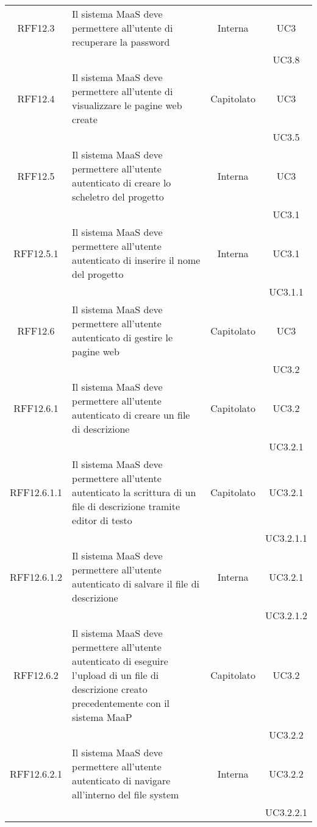 \begin{longtable}{|c|p{6cm}|c|c|}
\midrule
RFF12.3
& Il sistema MaaS deve permettere all'utente di recuperare la password
& Interna
& UC3\\
& & & UC3.8\\

\midrule
RFF12.4
& Il sistema MaaS deve permettere all'utente di visualizzare le pagine web create
& Capitolato
& UC3\\
& & & UC3.5\\

\midrule
RFF12.5
& Il sistema MaaS deve permettere all'utente autenticato di creare lo scheletro del progetto
& Interna
& UC3\\
& & & UC3.1\\

\midrule
RFF12.5.1
& Il sistema MaaS deve permettere all'utente autenticato di inserire il nome del progetto
& Interna
& UC3.1\\
& & & UC3.1.1\\

\midrule
RFF12.6
& Il sistema MaaS deve permettere all'utente autenticato di gestire le pagine web
& Capitolato
& UC3\\
& & & UC3.2\\

\midrule
RFF12.6.1
& Il sistema MaaS deve permettere all'utente autenticato di creare un file di descrizione
& Capitolato
& UC3.2\\
& & & UC3.2.1\\

\midrule
RFF12.6.1.1
& Il sistema MaaS deve permettere all'utente autenticato la scrittura di un file di descrizione tramite editor di testo
& Capitolato
& UC3.2.1\\
& & & UC3.2.1.1\\

\midrule
RFF12.6.1.2
& Il sistema MaaS deve permettere all'utente autenticato di salvare il file di descrizione
& Interna
& UC3.2.1\\
& & & UC3.2.1.2\\


\midrule
RFF12.6.2
& Il sistema MaaS deve permettere all'utente autenticato di eseguire l'upload di un file di descrizione creato precedentemente con il sistema MaaP
& Capitolato
& UC3.2\\
& & & UC3.2.2\\

\midrule
RFF12.6.2.1
& Il sistema MaaS deve permettere all'utente autenticato di navigare all'interno del file system
& Interna
& UC3.2.2\\
& & & UC3.2.2.1\\


\end{longtable}
